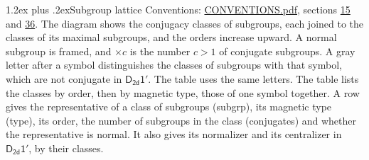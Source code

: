 \documentclass[10pt,a4paper]{article}
\makeatletter
\renewcommand\section{\@startsection{section}{1}{\z@}{-3ex plus -1ex minus -.2ex}%
  {1.2ex plus .2ex}{\normalfont\large\sffamily\bfseries\color{parttitle}}}
\numberwithin{equation}{section}
\newcommand{\grp}[1]{\mathsf{#1}}
\makeatother
\begin{document}
\section{Subgroup lattice}\label{s:subgroups}
Conventions: \href{../../CONVENTIONS.pdf}{CONVENTIONS.pdf}, sections \href{../../../rotation/CONVENTIONS.pdf\#conv.15}{15} and \href{../../CONVENTIONS.pdf\#conv.36}{36}.
The diagram shows the conjugacy classes of subgroups, each joined to the classes of its maximal subgroups, and the orders increase upward. \label{n:index.conjugates.c}\label{n:mark.conjugates}A normal subgroup is framed, and ${\times}c$ is the number $c > 1$ of conjugate subgroups. \label{n:mark.letter}A gray letter after a symbol distinguishes the classes of subgroups with that symbol, which are not conjugate in $\grp{D_{2d}1'}$. The table uses the same letters. The table lists the classes by order, then by magnetic type, those of one symbol together. \label{n:head.subgroup}\label{n:head.magnetic.type}\label{n:head.order}\label{n:head.conjugates}\label{n:head.normal}A row gives the representative of a class of subgroups (subgrp), its magnetic type (type), its order, the number of subgroups in the class (conjugates) and whether the representative is normal. \label{n:head.normalizer}\label{n:head.centralizer}It also gives its normalizer and its centralizer in $\grp{D_{2d}1'}$, by their classes. 
\end{document}
